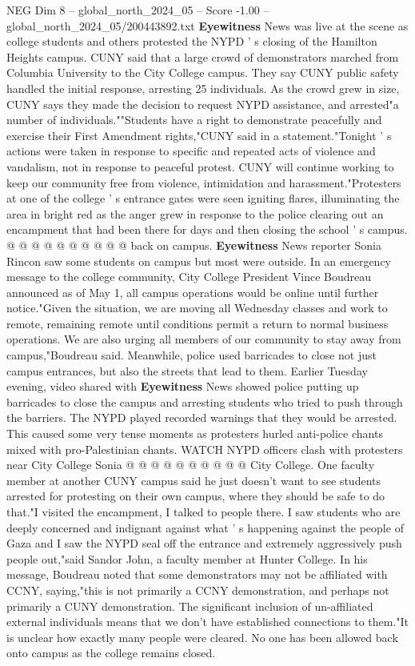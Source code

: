 \begin{textsample}{NEG Dim 8 – global\_north\_2024\_05 – Score -1.00 – global\_north\_2024\_05/200443892.txt}  \label{ex:f8_neg_382}
\textbf{Eyewitness} News was live at the scene as college students and others protested the NYPD ' s closing of the Hamilton Heights campus.
CUNY said that a large crowd of demonstrators marched from Columbia University to the City College campus.
They say CUNY public safety handled the initial response, arresting 25 individuals.
As the crowd grew in size, CUNY says they made the decision to request NYPD assistance, and arrested"a number of individuals.""Students have a right to demonstrate peacefully and exercise their First Amendment rights,"CUNY said in a statement."Tonight ' s actions were taken in response to specific and repeated acts of violence and vandalism, not in response to peaceful protest.
CUNY will continue working to keep our community free from violence, intimidation and harassment."Protesters at one of the college ' s entrance gates were seen igniting flares, illuminating the area in bright red as the anger grew in response to the police clearing out an encampment that had been there for days and then closing the school ' s campus. @ @ @ @ @ @ @ @ @ @ back on campus. \textbf{Eyewitness} News reporter Sonia Rincon saw some students on campus but most were outside.
In an emergency message to the college community, City College President Vince Boudreau announced as of May 1, all campus operations would be online until further notice."Given the situation, we are moving all Wednesday classes and work to remote, remaining remote until conditions permit a return to normal business operations.
We are also urging all members of our community to stay away from campus,"Boudreau said.
Meanwhile, police used barricades to close not just campus entrances, but also the streets that lead to them.
Earlier Tuesday evening, video shared with \textbf{Eyewitness} News showed police putting up barricades to close the campus and arresting students who tried to push through the barriers.
The NYPD played recorded warnings that they would be arrested.
This caused some very tense moments as protesters hurled anti-police chants mixed with pro-Palestinian chants.
WATCH NYPD officers clash with protesters near City College Sonia @ @ @ @ @ @ @ @ @ @ City College.
One faculty member at another CUNY campus said he just doesn't want to see students arrested for protesting on their own campus, where they should be safe to do that."I visited the encampment, I talked to people there.
I saw students who are deeply concerned and indignant against what ' s happening against the people of Gaza and I saw the NYPD seal off the entrance and extremely aggressively push people out,"said Sandor John, a faculty member at Hunter College.
In his message, Boudreau noted that some demonstrators may not be affiliated with CCNY, saying,"this is not primarily a CCNY demonstration, and perhaps not primarily a CUNY demonstration.
The significant inclusion of un-affiliated external individuals means that we don't have established connections to them."It is unclear how exactly many people were cleared.
No one has been allowed back onto campus as the college remains closed.

\end{textsample}
